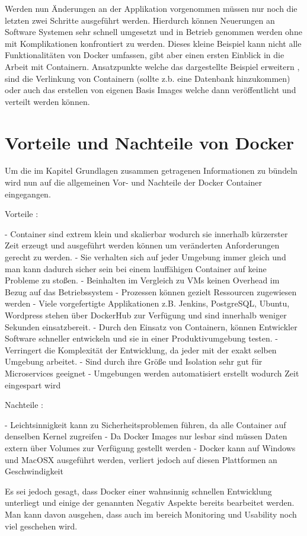\documentclass[12pt,toc=bib,toc=listof]{scrreprt}
\begin{document}
Werden nun Änderungen an der Applikation vorgenommen müssen nur noch die letzten zwei Schritte ausgeführt werden.
Hierdurch können Neuerungen an Software Systemen sehr schnell umgesetzt und in Betrieb genommen werden ohne mit Komplikationen konfrontiert zu werden.
Dieses kleine Beispiel kann nicht alle Funktionalitäten von Docker umfassen, gibt aber einen ersten Einblick in die Arbeit mit Containern.
Ansatzpunkte welche das dargestellte Beispiel erweitern , sind die Verlinkung von Containern (sollte z.b. eine Datenbank hinzukommen) oder auch das erstellen von eigenen Basis Images welche dann veröffentlicht und verteilt werden können.

\section{Vorteile und Nachteile von Docker}
Um die im Kapitel Grundlagen zusammen getragenen Informationen zu bündeln wird nun auf die allgemeinen Vor- und Nachteile der Docker Container eingegangen.

Vorteile :

- Container sind extrem klein und skalierbar wodurch sie innerhalb kürzerster Zeit erzeugt und ausgeführt werden können um veränderten Anforderungen gerecht zu werden.
- Sie verhalten sich auf jeder Umgebung immer gleich und man kann dadurch sicher sein bei einem lauffähigen Container auf keine Probleme zu stoßen.
- Beinhalten im Vergleich zu VMs keinen Overhead im Bezug auf das Betriebssystem
- Prozessen können gezielt Ressourcen zugewiesen werden
- Viele vorgefertigte Applikationen z.B. Jenkins, PostgreSQL, Ubuntu, Wordpress stehen über DockerHub zur Verfügung und sind innerhalb weniger Sekunden einsatzbereit.
- Durch den Einsatz von Containern, können Entwickler Software schneller entwickeln und sie in einer Produktivumgebung testen.
- Verringert die Komplexität der Entwicklung, da jeder mit der exakt selben Umgebung arbeitet.
- Sind durch ihre Größe und Isolation sehr gut für Microservices geeignet 
- Umgebungen werden automatisiert erstellt wodurch Zeit eingespart wird

Nachteile :

- Leichtsinnigkeit kann zu Sicherheitsproblemen führen, da alle Container auf denselben Kernel zugreifen
- Da Docker Images nur lesbar sind müssen Daten extern über Volumes zur Verfügung gestellt werden
- Docker kann auf Windows und MacOSX ausgeführt werden, verliert jedoch auf diesen Plattformen an Geschwindigkeit

Es sei jedoch gesagt, dass Docker einer wahnsinnig schnellen Entwicklung unterliegt und einige der genannten Negativ Aspekte bereits bearbeitet werden.
Man kann davon ausgehen, dass auch im bereich Monitoring und Usability noch viel geschehen wird.
\end{document}
